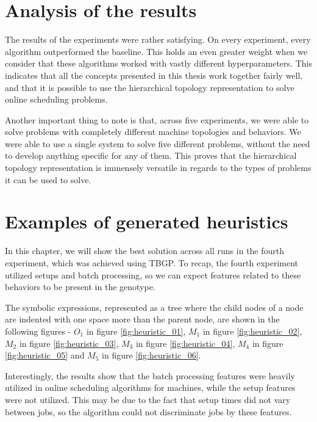\section{Analysis of the results}

The results of the experiments were rather satisfying. On every experiment, every algorithm outperformed the baseline. This holds an even greater weight when we consider that these algorithms worked with vastly different hyperparameters. This indicates that all the concepts presented in this thesis work together fairly well, and that it is possible to use the hierarchical topology representation to solve online scheduling problems.

Another important thing to note is that, across five experiments, we were able to solve problems with completely different machine topologies and behaviors. We were able to use a single system to solve five different problems, without the need to develop anything specific for any of them. This proves that the hierarchical topology representation is immensely versatile in regards to the types of problems it can be used to solve.

\section{Examples of generated heuristics}

In this chapter, we will show the best solution across all runs in the fourth experiment, which was achieved using TBGP. To recap, the fourth experiment utilized setups and batch processing, so we can expect features related to these behaviors to be present in the genotype.

The symbolic expressions, represented as a tree where the child nodes of a node are indented with one space more than the parent node, are shown in the following figures - $O_1$ in figure \ref{fig:heuristic_01}, $M_1$ in figure \ref{fig:heuristic_02}, $M_2$ in figure \ref{fig:heuristic_03}, $M_3$ in figure \ref{fig:heuristic_04}, $M_4$ in figure \ref{fig:heuristic_05} and $M_5$ in figure \ref{fig:heuristic_06}.

Interestingly, the results show that the batch processing features were heavily utilized in online scheduling algorithms for machines, while the setup features were not utilized. This may be due to the fact that setup times did not vary between jobs, so the algorithm could not discriminate jobs by these features.

